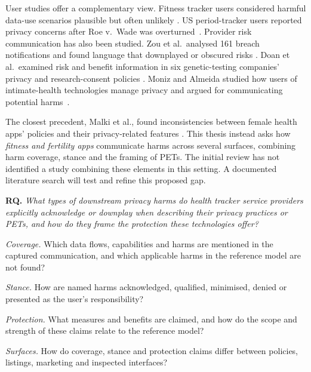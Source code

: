\documentclass[sigconf,nonacm,natbib=false]{acmart}
\begin{document}
User studies offer a complementary view. Fitness tracker users considered
harmful data-use scenarios plausible but often unlikely
\parencite{gabriele2020understanding}. US period-tracker users reported privacy
concerns after Roe v.~Wade was overturned~\parencite{cao2024deleted}.
Provider risk communication has also been studied. Zou et al.\ analysed 161
breach notifications and found language that downplayed or obscured risks
\parencite{zou2019might}. Doan et al.\ examined risk and benefit information in
six genetic-testing companies' privacy and research-consent policies
\parencite{doan2024transparency}. Moniz and Almeida studied how users of
intimate-health technologies manage privacy and argued for communicating
potential harms~\parencite{moniz2025toward}.

The closest precedent, Malki et al., found inconsistencies between female
health apps' policies and their privacy-related features
\parencite{malki2024exploring}. This thesis instead asks how \emph{fitness and
fertility apps} communicate harms across several surfaces, combining harm
coverage, stance and the framing of PETs. The initial review has not
identified a study combining these elements in this setting. A documented literature search will test
and refine this proposed gap.

\noindent\textbf{RQ.} \emph{What types of downstream privacy harms do health
tracker service providers explicitly acknowledge or downplay when describing
their privacy practices or PETs, and how do they frame the protection these
technologies offer?}

\begin{description}[leftmargin=1.5em,itemsep=1pt,topsep=3pt,
                    labelindent=0pt,font=\normalfont\bfseries]
  \item[RQ1] \textit{Coverage.} Which data flows, capabilities and harms are
    mentioned in the captured communication, and which applicable harms
    in the reference model are not found?
  \item[RQ2] \textit{Stance.} How are named harms acknowledged, qualified,
    minimised, denied or presented as the user's responsibility?
  \item[RQ3] \textit{Protection.} What measures and benefits are claimed,
    and how do the scope and strength of these claims relate to the
    reference model?
  \item[RQ4] \textit{Surfaces.} How do coverage, stance and protection claims
    differ between policies, listings, marketing and inspected interfaces?
\end{description}
\end{document}
